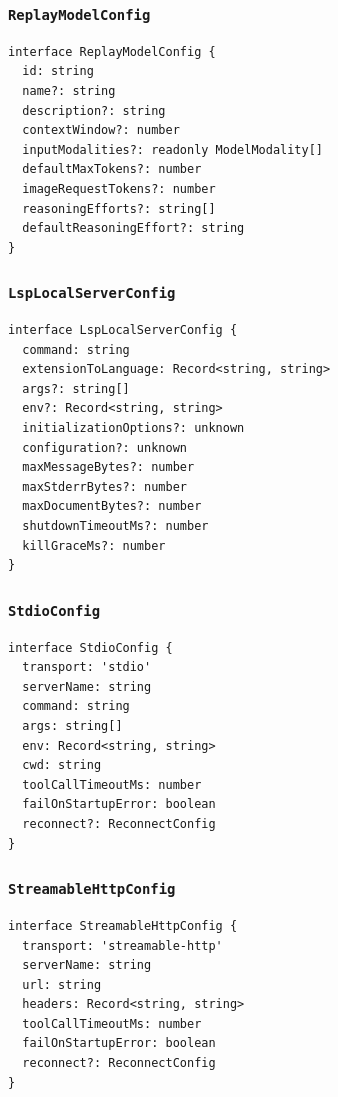 \documentclass[11pt,a4paper]{article}
\begin{document}
\subsubsection*{\texttt{ReplayModelConfig}}


\begin{lstlisting}
interface ReplayModelConfig {
  id: string
  name?: string
  description?: string
  contextWindow?: number
  inputModalities?: readonly ModelModality[]
  defaultMaxTokens?: number
  imageRequestTokens?: number
  reasoningEfforts?: string[]
  defaultReasoningEffort?: string
}
\end{lstlisting}


\subsubsection*{\texttt{LspLocalServerConfig}}


\begin{lstlisting}
interface LspLocalServerConfig {
  command: string
  extensionToLanguage: Record<string, string>
  args?: string[]
  env?: Record<string, string>
  initializationOptions?: unknown
  configuration?: unknown
  maxMessageBytes?: number
  maxStderrBytes?: number
  maxDocumentBytes?: number
  shutdownTimeoutMs?: number
  killGraceMs?: number
}
\end{lstlisting}


\subsubsection*{\texttt{StdioConfig}}


\begin{lstlisting}
interface StdioConfig {
  transport: 'stdio'
  serverName: string
  command: string
  args: string[]
  env: Record<string, string>
  cwd: string
  toolCallTimeoutMs: number
  failOnStartupError: boolean
  reconnect?: ReconnectConfig
}
\end{lstlisting}


\subsubsection*{\texttt{StreamableHttpConfig}}


\begin{lstlisting}
interface StreamableHttpConfig {
  transport: 'streamable-http'
  serverName: string
  url: string
  headers: Record<string, string>
  toolCallTimeoutMs: number
  failOnStartupError: boolean
  reconnect?: ReconnectConfig
}
\end{lstlisting}
\end{document}

